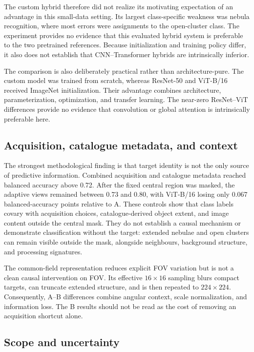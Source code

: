 \documentclass[preprint,12pt,authoryear]{elsarticle}
\begin{document}
The custom hybrid therefore did not realize its motivating expectation of an
advantage in this small-data setting. Its largest class-specific weakness was
nebula recognition, where most errors were assignments to the open-cluster class.
The experiment provides no evidence that this evaluated hybrid system is preferable
to the two pretrained references. Because initialization and training policy differ,
it also does not establish that CNN--Transformer hybrids are intrinsically inferior.

The comparison is also deliberately practical rather than architecture-pure. The
custom model was trained from scratch, whereas ResNet-50 and ViT-B/16 received
ImageNet initialization. Their advantage combines architecture, parameterization,
optimization, and transfer learning. The near-zero ResNet--ViT differences provide
no evidence that convolution or global attention is intrinsically preferable here.

\subsection{Acquisition, catalogue metadata, and context}

The strongest methodological finding is that target identity is not the only source
of predictive information. Combined acquisition and catalogue metadata reached
balanced accuracy above 0.72. After the fixed central region was masked, the adaptive
views remained between 0.73 and 0.80, with ViT-B/16 losing only 0.067
balanced-accuracy points relative to A. These controls show that class labels covary
with acquisition choices, catalogue-derived object extent, and image content outside
the central mask. They do not establish a causal mechanism or demonstrate
classification without the target: extended nebulae and open clusters can remain
visible outside the mask, alongside neighbours, background structure, and processing
signatures.

The common-field representation reduces explicit FOV variation but is not a clean
causal intervention on FOV. Its effective $16\times16$ sampling blurs compact
targets, can truncate extended structure, and is then repeated to $224\times224$.
Consequently, A--B differences combine angular context, scale normalization, and
information loss. The B results should not be read as the cost of removing an
acquisition shortcut alone.

\subsection{Scope and uncertainty}
\end{document}
